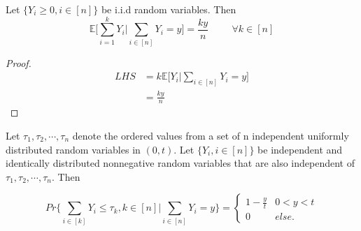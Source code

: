 \documentclass[a4paper,english,12pt]{article}
\begin{document}
\begin{lem}\label{unif}
Let $\{Y_i \geq 0,i \in [n]\}$ be i.i.d random variables. Then \\
\begin{equation*}
 \mathbb{E}\Bigg[\sum_{i=1}^{k}Y_i \Big| \sum_{i \in [n]}Y_i=y\Bigg]=\frac{ky}{n} \hspace{1cm} \forall k \in [n]
\end{equation*}
\end{lem}
\begin{proof}
\begin{align*}
	LHS & = k \mathbb{E}\Bigg[Y_i \Big| \sum_{i \in [n]}Y_i=y\Bigg]\\
	& = \frac{ky}{n}
\end{align*}
\end{proof}
\begin{lem}
Let $\tau_1,\tau_2,\cdots,\tau_n$ denote the ordered values from a set of n independent uniformly distributed random variables in $(0,t)$. Let $\{Y_i,i \in [n]\}$ be independent and identically distributed nonnegative random variables that are also independent of $\tau_1,\tau_2,\cdots,\tau_n$. Then
\end{lem}
\begin{equation}
Pr\Bigg\{\sum_{i\in [k]}Y_i \leq \tau_k,k \in [n] \Big| \sum_{i\in [n]}Y_i=y \Bigg\} = 
\begin{cases}
1-\frac{y}{t} &0 < y < t\\
0 & else.
\end{cases}
\end{equation}
\end{document}
